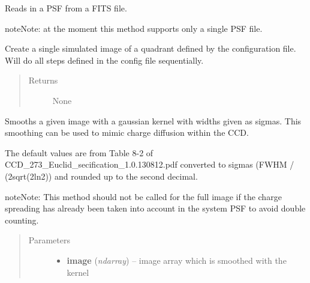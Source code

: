 \documentclass[a4paper,11pt,english]{sphinxmanual}
\begin{document}
\begin{fulllineitems}
\begin{fulllineitems}
\end{fulllineitems}


\begin{fulllineitems}
\label{simulator:simulator.simulator.VISsimulator.readPSFs}
Reads in a PSF from a FITS file.

\begin{notice}{note}{Note:}
at the moment this method supports only a single PSF file.
\end{notice}

\end{fulllineitems}


\begin{fulllineitems}
\label{simulator:simulator.simulator.VISsimulator.simulate}
Create a single simulated image of a quadrant defined by the configuration file.
Will do all steps defined in the config file sequentially.
\begin{quote}\begin{description}
\item[{Returns}] \leavevmode
None

\end{description}\end{quote}

\end{fulllineitems}


\begin{fulllineitems}
\label{simulator:simulator.simulator.VISsimulator.smoothingWithChargeDiffusion}
Smooths a given image with a gaussian kernel with widths given as sigmas.
This smoothing can be used to mimic charge diffusion within the CCD.

The default values are from Table 8-2 of CCD\_273\_Euclid\_secification\_1.0.130812.pdf converted
to sigmas (FWHM / (2sqrt(2ln2)) and rounded up to the second decimal.

\begin{notice}{note}{Note:}
This method should not be called for the full image if the charge spreading
has already been taken into account in the system PSF to avoid double counting.
\end{notice}
\begin{quote}\begin{description}
\item[{Parameters}] \leavevmode\begin{itemize}
\item {} 
\textbf{image} (\emph{ndarray}) -- image array which is smoothed with the kernel


\end{itemize}
\end{description}
\end{quote}
\end{fulllineitems}
\end{fulllineitems}
\end{document}
